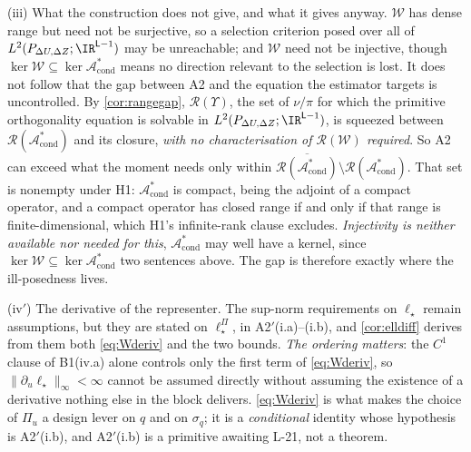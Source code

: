 \begin{remark}
(iii) What the construction does not give, and what it gives anyway. $\mathcal W$ has dense range
but need not be surjective, so a selection criterion posed over all of
$L^{2}(P_{\Delta U,\Delta Z};\IR^{\mathsf L-1})$ may
be unreachable; and $\mathcal W$ need not be injective, though
$\ker\mathcal W\subseteq\ker\mathcal A^\ast_{\mathrm{cond}}$ means no direction relevant to the selection
is lost. It does not follow that the gap between A2 and the equation the estimator targets is
uncontrolled. By \cref{cor:rangegap}, $\mathcal R(\Upsilon)$, the set of $\nu/\pi$ for which the
primitive orthogonality equation is solvable in $L^{2}(P_{\Delta U,\Delta Z};\IR^{\mathsf L-1})$, is squeezed between
$\mathcal R(\mathcal A^\ast_{\mathrm{cond}})$ and its closure, \emph{with no characterisation of
$\mathcal R(\mathcal W)$ required}. So A2 can exceed what the moment needs only within
$\overline{\mathcal R(\mathcal A^\ast_{\mathrm{cond}})}\setminus\mathcal R(\mathcal A^\ast_{\mathrm{cond}})$.
That set is nonempty under H1: $\mathcal A^\ast_{\mathrm{cond}}$ is compact, being the adjoint of a
compact operator, and a compact operator has closed range if and only if that range is
finite-dimensional, which H1's infinite-rank clause excludes. \emph{Injectivity is neither available nor
needed for this}, $\mathcal A^\ast_{\mathrm{cond}}$ may well have a kernel, since
$\ker\mathcal W\subseteq\ker\mathcal A^\ast_{\mathrm{cond}}$ two sentences above. The
gap is therefore exactly where the ill-posedness lives.

(iv$'$) The derivative of the representer. The sup-norm requirements on $\ell_\star$ remain
assumptions, but they are stated on $\ell^\Pi_\star$, in A2$'$(i.a)--(i.b), and
\cref{cor:elldiff} derives from them both \eqref{eq:Wderiv} and the two bounds. \emph{The ordering
matters}: the $C^{1}$ clause of B1(iv.a) alone controls only the first term of
\eqref{eq:Wderiv}, so $\|\partial_u\ell_\star\|_\infty<\infty$ cannot be assumed directly without
assuming the existence of a derivative nothing else in the block delivers.
\eqref{eq:Wderiv} is what makes the choice of $\Pi_u$ a design lever on $q$ and on
$\sigma_q$; it is a \emph{conditional} identity whose hypothesis is A2$'$(i.b), and A2$'$(i.b) is a
primitive awaiting L-21, not a theorem.


\end{remark}
